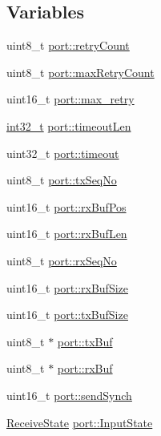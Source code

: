 \subsection*{Variables}
\begin{DoxyCompactItemize}
\item 
uint8\-\_\-t \hyperlink{group___uploader_gaa59e48abe3c6ec88333502c7abd9c309}{port\-::retry\-Count}
\item 
uint8\-\_\-t \hyperlink{group___uploader_ga39fea4d573ab6d52b3b2df145d6d3f7a}{port\-::max\-Retry\-Count}
\item 
uint16\-\_\-t \hyperlink{group___uploader_ga6a20c78337e965260038e132527ba852}{port\-::max\-\_\-retry}
\item 
\hyperlink{glext_8h_a37994e3b11c72957c6f454c6ec96d43d}{int32\-\_\-t} \hyperlink{group___uploader_gacad18aa8d7e13c6500409da966437d3d}{port\-::timeout\-Len}
\item 
uint32\-\_\-t \hyperlink{group___uploader_gac5f404a47ec2583f83bd610d5f184308}{port\-::timeout}
\item 
uint8\-\_\-t \hyperlink{group___uploader_ga9add555476b07ac554ed3371358848bb}{port\-::tx\-Seq\-No}
\item 
uint16\-\_\-t \hyperlink{group___uploader_ga75073512a14d809c8ed03df447815d09}{port\-::rx\-Buf\-Pos}
\item 
uint16\-\_\-t \hyperlink{group___uploader_ga1de477395cd5f7c06623860c2d8017e4}{port\-::rx\-Buf\-Len}
\item 
uint8\-\_\-t \hyperlink{group___uploader_ga82ee05e7b1de6f1b55b375364ce5bc83}{port\-::rx\-Seq\-No}
\item 
uint16\-\_\-t \hyperlink{group___uploader_ga640561a803c92539943ec445afba5e72}{port\-::rx\-Buf\-Size}
\item 
uint16\-\_\-t \hyperlink{group___uploader_ga108da44374d16b8153824a65fec5a7ae}{port\-::tx\-Buf\-Size}
\item 
uint8\-\_\-t $\ast$ \hyperlink{group___uploader_gae89971c9e5c4436adb8255a2a086577d}{port\-::tx\-Buf}
\item 
uint8\-\_\-t $\ast$ \hyperlink{group___uploader_gada605b2b244d99c3f2e7d9a77554d960}{port\-::rx\-Buf}
\item 
uint16\-\_\-t \hyperlink{group___uploader_gafc6af17b7bd943cd40a0223eed26a0c3}{port\-::send\-Synch}
\item 
\hyperlink{experimental_2_u_s_b___u_p_l_o_a_d___t_o_o_l_2_s_s_p_2common_8h_ab10fc109fdda19fca8e7faf999d5a342}{Receive\-State} \hyperlink{group___uploader_ga4e66fb46404301e2985093c34ae57379}{port\-::\-Input\-State}

\end{DoxyCompactItemize}
